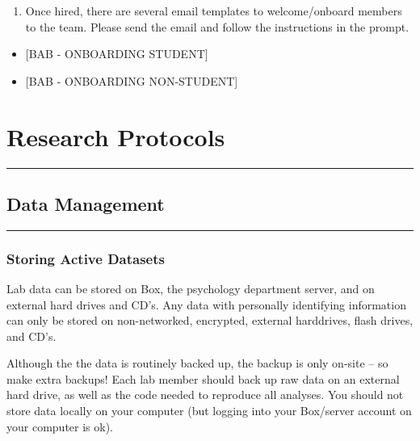 \documentclass[]{book}
\providecommand{\tightlist}{%
  \setlength{\itemsep}{0pt}\setlength{\parskip}{0pt}}
\begin{document}
\begin{enumerate}
\def\labelenumi{\arabic{enumi}.}
\setcounter{enumi}{3}
\tightlist
\item
  Once hired, there are several email templates to welcome/onboard members to the team. Please send the email and follow the instructions in the prompt.
\end{enumerate}

\begin{itemize}
\tightlist
\item
  {[}BAB - ONBOARDING STUDENT{]}
\item
  {[}BAB - ONBOARDING NON-STUDENT{]}
\end{itemize}

\hypertarget{research-protocols}{%
\chapter{Research Protocols}\label{research-protocols}}

\begin{center}\rule{0.5\linewidth}{0.5pt}\end{center}

\hypertarget{data-management}{%
\section{Data Management}\label{data-management}}

\begin{center}\rule{0.5\linewidth}{0.5pt}\end{center}

\hypertarget{storing-active-datasets}{%
\subsection{Storing Active Datasets}\label{storing-active-datasets}}

Lab data can be stored on Box, the psychology department server, and on external hard drives and CD's. Any data with personally identifying information can only be stored on non-networked, encrypted, external harddrives, flash drives, and CD's.

Although the the data is routinely backed up, the backup is only on-site -- so make extra backups! Each lab member should back up raw data on an external hard drive, as well as the code needed to reproduce all analyses. You should not store data locally on your computer (but logging into your Box/server account on your computer is ok).
\end{document}
